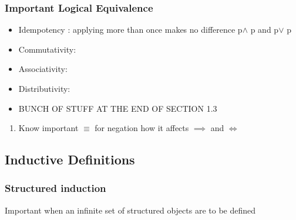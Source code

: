 \documentclass[11pt]{article}
\begin{document}
\subsubsection{Important Logical Equivalence}
\label{sec:orgacba5bb}
\begin{itemize}
\item Idempotency : applying more than once makes no difference p\(\land\) p and p\(\lor\) p
\item Commutativity:
\item Associativity:
\item Distributivity:
\item BUNCH OF STUFF AT THE END OF SECTION 1.3
\end{itemize}
\begin{enumerate}
\item Know important \(\equiv\) for negation how it affects \(\implies\) and \(\iff\)
\label{sec:org2da9448}
\end{enumerate}
\subsection{Inductive Definitions}
\label{sec:org564c100}
\subsubsection{Structured induction}
\label{sec:org0eccdc6}
Important when an infinite set of structured objects are to be defined 
\end{document}
